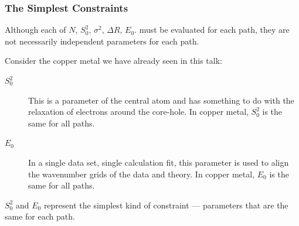 \documentclass[10pt, xcolor=x11names, compress]{beamer}
\begin{document}
\begin{frame}
  \frametitle{The Simplest Constraints}

  Although each of 
  {\color{SlateBlue3}$N$},
  {\color{SlateBlue3}$S_0^2$},
  {\color{SlateBlue3}$\sigma^2$},
  {\color{SlateBlue3}$\Delta R$},
  {\color{SlateBlue3}$E_0$}.
  must be evaluated for each path, they are not necessarily
  independent parameters for each path.

  \bigskip

  Consider the copper metal we have already seen in this talk:
  \begin{description}
  \item[$S_0^2$] This is a parameter of the central atom and has
    something to do with the relaxation of electrons around the
    core-hole.  In copper metal, {\color{SlateBlue3}$S_0^2$} is
    the same for all paths.
  \item[$E_0$] In a single data set, single {\feff} calculation fit,
    this parameter is used to align the wavenumber grids of the data
    and theory.  In copper metal, {\color{SlateBlue3}$E_0$} is the
    same for all paths.
  \end{description}
  \begin{exampleblock}{}
    {\color{SlateBlue3}$S_0^2$} and {\color{SlateBlue3}$E_0$}
    represent the simplest kind of constraint --- parameters that are
    the same for each path.
  \end{exampleblock}

\end{frame}
\end{document}
